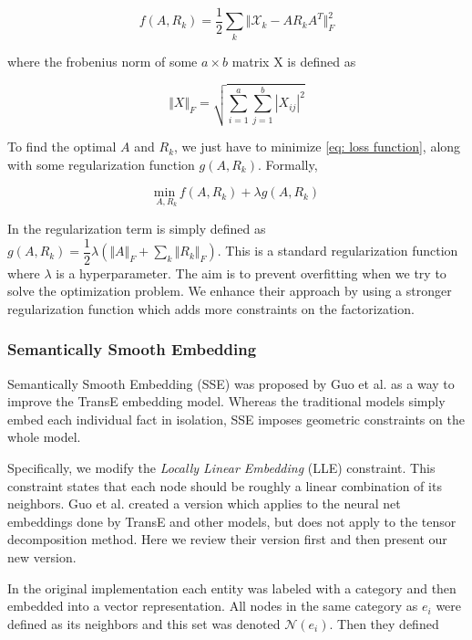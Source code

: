 \documentclass[pageno]{jpaper}
\begin{document}
\begin{equation}
\label{eq: loss function}
    f(A, R_k) = \dfrac{1}{2} \sum_k \Vert \mathcal{X}_k - AR_kA^T \Vert _F^2
\end{equation}

where the frobenius norm of some $a\times b$ matrix X is defined as

$$\Vert X \Vert_F = \sqrt{\sum_{i=1}^a \sum_{j=1}^b |X_{ij}|^2}$$

To find the optimal $A$ and $R_k$, we just have to minimize \ref{eq: loss
function}, along with some regularization function $g(A, R_k)$. Formally,

\begin{equation}
    \label{eq: to minimize}
    \underset{A, R_k}{\text{min }} f(A,R_k) + \lambda g(A, R_k)
\end{equation}

In \cite{Nickel2011}\cite{Chang2014} the regularization term is simply defined
as $g(A, R_k) = \dfrac{1}{2}\lambda (\Vert A \Vert_F + \sum_k \Vert R_k
\Vert_F)$. This is a standard regularization function where $\lambda$ is a
hyperparameter. The aim is to prevent overfitting when we try to solve the
optimization problem. We enhance their approach by using a stronger
regularization function which adds more constraints on the factorization. \\

\subsubsection{Semantically Smooth Embedding}
\label{Semantically Smooth Embedding}

Semantically Smooth Embedding (SSE) was proposed by Guo et al.\cite{Guo2015} as a
way to improve the TransE\cite{Bordes2013} embedding model. Whereas the
traditional models simply embed each individual fact in isolation, SSE imposes
geometric constraints on the whole model.

Specifically, we modify the \textit{Locally Linear Embedding} (LLE) constraint.
This constraint states that each node should be roughly a linear combination of
its neighbors\cite{Roweis2000}. Guo et al. created a version which applies to
the neural net embeddings done by TransE and other models, but does not apply to
the tensor decomposition method. Here we review their version first and then
present our new version.

In the original implementation each entity was labeled with a category and
then embedded into a vector representation. All nodes in the same category as
$e_i$ were defined as its neighbors and this set was denoted $\mathcal{N}(e_i)$.
Then they defined
\end{document}
